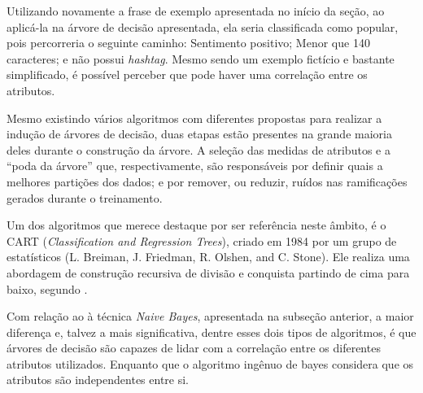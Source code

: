 \documentclass[oneside,openright,12pt]{ufsm_2015} %
\begin{document}
    \par Utilizando novamente a frase de exemplo apresentada no início da seção, ao aplicá-la na árvore de decisão apresentada, ela seria classificada como popular, pois percorreria o seguinte caminho: Sentimento positivo; Menor que 140 caracteres; e não possui \textit{hashtag}. Mesmo sendo um exemplo fictício e bastante simplificado, é possível perceber que pode haver uma correlação entre os atributos.
    
    \par Mesmo existindo vários algoritmos com diferentes propostas para realizar a indução de árvores de decisão, duas etapas estão presentes na grande maioria deles durante o construção da árvore. A seleção das medidas de atributos e a ``poda da árvore'' que, respectivamente, são responsáveis por definir quais a melhores partições dos dados; e por remover, ou reduzir, ruídos nas ramificações gerados durante o treinamento.
    
    \par Um dos algoritmos que merece destaque por ser referência neste âmbito, é o CART (\textit{Classification and Regression Trees}), criado em 1984 por um grupo de estatísticos (L. Breiman, J. Friedman, R. Olshen, and C. Stone). Ele realiza uma abordagem de construção recursiva de divisão e conquista partindo de cima para baixo, segundo \cite{book:han:11}.
    
    \par Com relação ao à técnica \textit{Naive Bayes}, apresentada na subseção anterior, a maior diferença e, talvez a mais significativa, dentre esses dois tipos de algoritmos, é que árvores de decisão são capazes de lidar com a correlação entre os diferentes atributos utilizados. Enquanto que o algoritmo ingênuo de bayes considera que os atributos são independentes entre si.


\end{document}
